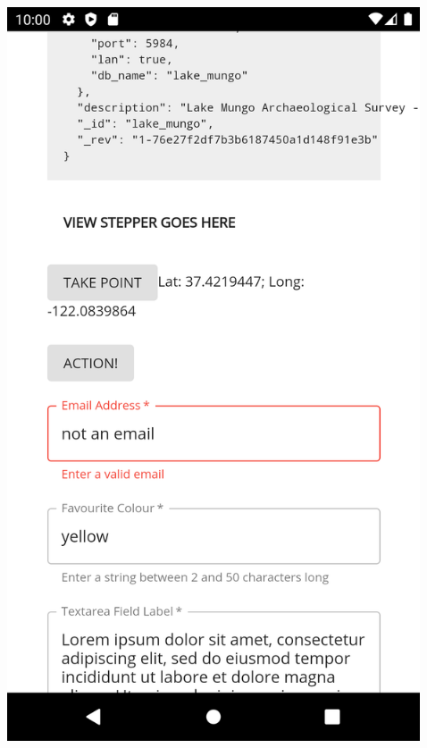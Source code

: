 \documentclass[
	aspectratio=169, %
	11pt, %
	t, %
]{beamer}
\begin{document}
\begin{frame}
\begin{columns}
\begin{column}{0.5\textwidth}
\end{column}
\begin{column}{0.2\textwidth}
\begin{center}
\includegraphics[width=\textwidth]{Images/Screenshot_1620777635.png}
\end{center}
\end{column}
\begin{column}{0.17\textwidth}
\begin{center}

\end{center}
\end{column}
\end{columns}
\end{frame}
\end{document}
